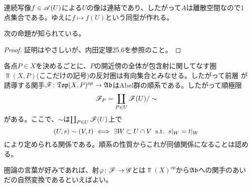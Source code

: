 \begin{rem}
  連続写像$f \in \mathscr{A} (U)$による$U$の像は連結であり、したがって$A$は離散空間なので1点集合である。ゆえに$f \mapsto f(U)$という同型が作れる。
\end{rem}




\begin{rem}
次の命題が知られている。
  \begin{proof}
    証明はやさしいが、内田\cite{内田}定理25.6を参照のこと。
  \end{proof}
\end{rem}




\begin{rem}
  各点$P \in X$を決めるごとに、$P$の開近傍の全体が包含射に関してなす圏$\Top(X,P)$(ここだけの記号)の反対圏は有向集合とみなせる。したがって前層
  が誘導する関手$\mathscr{F} \colon \mathfrak{Top}(X,P)^{op} \to \mathfrak{Ab}$はAbel群の順系である。したがって順極限
  \[
  \mathscr{F}_P = \coprod_{P \in U } \mathscr{F}(U) / \sim
  \]
  がある。ここで、$\sim$は$ \coprod_{P \in U } \mathscr{F}(U)$上で
  \[
(U,s) \sim (V,t) \iff  \exists W \subset U \cap V \; \; \text{s.t.} \; \; s|_W = t|_W
  \]
  により定められる関係である。順系の性質からこれが同値関係になることは認める。
\end{rem}



\begin{rem}
  圏論の言葉が好みであれば、射${\varphi} \colon \mathscr{F} \to \mathscr{G}$とは$\Top(X)^{op}$から$\mathfrak{Ab}$への関手のあいだの自然変換であるといえばよい。
\end{rem}




